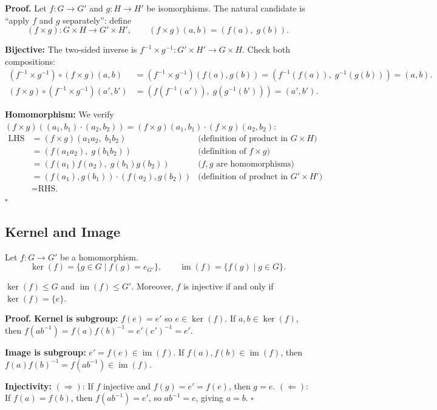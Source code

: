 \documentclass[11pt]{report}
\renewenvironment{proof}[1][Proof]{\noindent\textbf{#1.} }{\hfill$\square$\par\vspace{5pt}}
\begin{document}
\begin{proof}
Let $f: G \to G'$ and $g: H \to H'$ be isomorphisms. The natural candidate is ``apply $f$ and $g$ separately'': define
\[(f \times g): G \times H \to G' \times H', \qquad (f \times g)(a, b) = (f(a), \; g(b)).\]

\textbf{Bijective:} The two-sided inverse is $f^{-1} \times g^{-1}: G' \times H' \to G \times H$. Check both compositions:
\begin{align*}
(f^{-1} \times g^{-1}) \circ (f \times g)(a, b) &= (f^{-1} \times g^{-1})(f(a), g(b)) = (f^{-1}(f(a)), \; g^{-1}(g(b))) = (a, b). \\
(f \times g) \circ (f^{-1} \times g^{-1})(a', b') &= (f(f^{-1}(a')), \; g(g^{-1}(b'))) = (a', b').
\end{align*}

\textbf{Homomorphism:} We verify $(f \times g)((a_1, b_1) \cdot (a_2, b_2)) = (f \times g)(a_1, b_1) \cdot (f \times g)(a_2, b_2)$:
\begin{align*}
\text{LHS} &= (f \times g)(a_1 a_2, \; b_1 b_2) &\text{(definition of product in } G \times H\text{)}\\
&= (f(a_1 a_2), \; g(b_1 b_2)) &\text{(definition of } f \times g\text{)}\\
&= (f(a_1)f(a_2), \; g(b_1)g(b_2)) &\text{(}f, g \text{ are homomorphisms)}\\
&= (f(a_1), g(b_1)) \cdot (f(a_2), g(b_2)) &\text{(definition of product in } G' \times H'\text{)}\\
&= \text{RHS.}
\end{align*}
\end{proof}

\subsection{Kernel and Image}

\begin{defbox}
Let $f: G \to G'$ be a homomorphism.
\[\ker(f) = \{g \in G \mid f(g) = e_{G'}\}, \qquad \operatorname{im}(f) = \{f(g) \mid g \in G\}.\]
\end{defbox}

\begin{propbox}
$\ker(f) \leq G$ and $\operatorname{im}(f) \leq G'$. Moreover, $f$ is injective if and only if $\ker(f) = \{e\}$.
\end{propbox}

\begin{proof}
\textbf{Kernel is subgroup:} $f(e) = e'$ so $e \in \ker(f)$. If $a, b \in \ker(f)$, then $f(ab^{-1}) = f(a)f(b)^{-1} = e'(e')^{-1} = e'$.

\textbf{Image is subgroup:} $e' = f(e) \in \operatorname{im}(f)$. If $f(a), f(b) \in \operatorname{im}(f)$, then $f(a)f(b)^{-1} = f(ab^{-1}) \in \operatorname{im}(f)$.

\textbf{Injectivity:} $(\Rightarrow)$: If $f$ injective and $f(g) = e' = f(e)$, then $g = e$. $(\Leftarrow)$: If $f(a) = f(b)$, then $f(ab^{-1}) = e'$, so $ab^{-1} = e$, giving $a = b$.
\end{proof}
\end{document}
